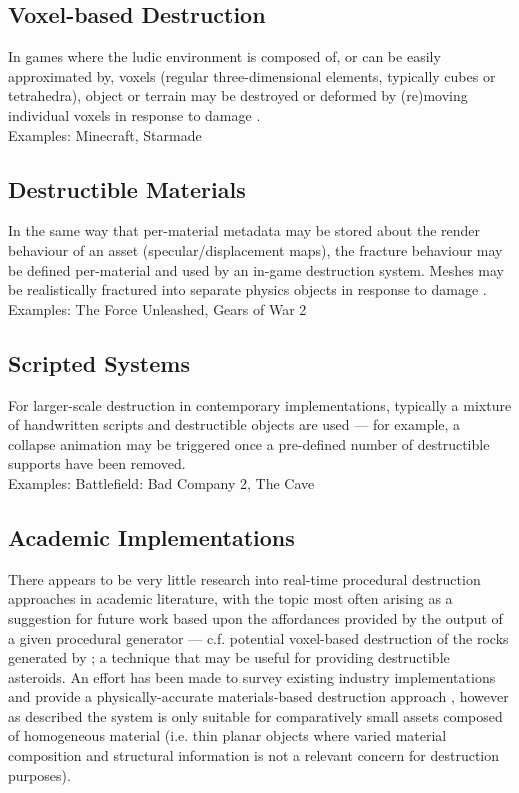 \documentclass[11pt]{report}
\begin{document}
		\subsection{Voxel-based Destruction}
			In games where the ludic environment is composed of, or can be easily approximated by, voxels (regular three-dimensional elements, typically cubes or tetrahedra), object or terrain may be destroyed or deformed by (re)moving individual voxels in response to damage \cite{davison2001deformable}.\\
			Examples: Minecraft, Starmade

		\subsection{Destructible Materials}
			In the same way that per-material metadata may be stored about the render behaviour of an asset (specular/displacement maps), the fracture behaviour may be defined per-material and used by an in-game destruction system. Meshes may be realistically fractured into separate physics objects in response to damage \cite{van2011procedural}. \\
			Examples: The Force Unleashed, Gears of War 2

		\subsection{Scripted Systems}
			For larger-scale destruction in contemporary implementations, typically a mixture of handwritten scripts and destructible objects are used --- for example, a collapse animation may be triggered once a pre-defined number of destructible supports have been removed. \\
			Examples: Battlefield: Bad Company 2, The Cave

		\subsection{Academic Implementations}
			There appears to be very little research into real-time procedural destruction approaches in academic literature, with the topic most often arising as a suggestion for future work based upon the affordances provided by the output of a given procedural generator --- c.f. potential voxel-based destruction of the rocks generated by \cite{dart2011speedrock}; a technique that may be useful for providing destructible asteroids. An effort has been made to survey existing industry implementations and provide a physically-accurate materials-based destruction approach \cite{van2011procedural}, however as described the system is only suitable for comparatively small assets composed of homogeneous material (i.e. thin planar objects where varied material composition and structural information is not a relevant concern for destruction purposes).
\end{document}
